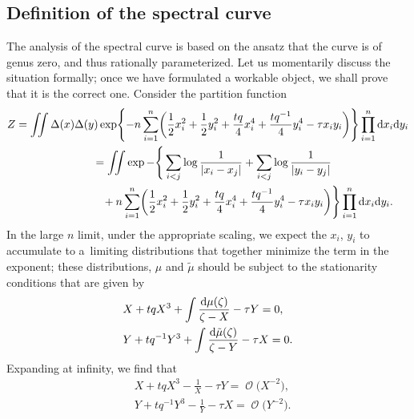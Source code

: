 \documentclass[10pt,a4paper]{amsart}
\DeclareMathOperator{\OO}{\mathcal{O}}
\numberwithin{equation}{section}
\begin{document}
\subsection{Definition of the spectral curve}
The analysis of the spectral curve is based on the ansatz that the curve is of genus zero, and thus rationally parameterized. Let us momentarily discuss the situation formally; once we have formulated a workable object, we shall prove that it is the correct one. Consider the partition function
 \begin{gather*}
 Z= \iint \Delta(x) \Delta(y) \exp\Biggl\{-n\sum_{i=1}^n \biggl(\frac{1}{2}x_i^2 + \frac{1}{2}y_i^2 + \frac{t q}{4} x_i^4 + \frac{t q^{-1}}{4} y_i^4 - \tau x_iy_i\biggr)\Biggr\} \prod_{i=1}^n {\rm d}x_i {\rm d}y_i\\
 \hphantom{Z}{}
= \iint \exp - \Bigg\{ \sum_{i < j} \log\frac{1}{|x_i - x_j|} + \sum_{i < j} \log\frac{1}{|y_i - y_j|} \\
\hphantom{Z=\iint \exp - \Bigg\{}{}
+ n\sum_{i=1}^n \biggl(\frac{1}{2}x_i^2 + \frac{1}{2}y_i^2 + \frac{t q}{4} x_i^4 + \frac{t q^{-1}}{4} y_i^4 - \tau x_iy_i\biggr)\Bigg\} \prod_{i=1}^n {\rm d}x_i {\rm d}y_i.
 \end{gather*}
In the large $n$ limit, under the appropriate scaling, we expect the $x_i$, $y_i$ to accumulate to a~limiting distributions that together minimize the term in the exponent; these distributions, $\mu$ and $\tilde \mu$ should be subject to the stationarity conditions that are given by
 \begin{align*}
 &X + t q X^3 + \int \frac{{\rm d}\mu(\zeta)}{\zeta - X} - \tau Y= 0,\\
 &Y + t q^{-1} Y^3 + \int \frac{{\rm d}\tilde{\mu}(\zeta)}{\zeta - Y} - \tau X= 0.
 \end{align*}
Expanding at infinity, we find that
 \begin{align}
 &X + t qX^3 - \frac{1}{X} - \tau Y= \OO\bigl(X^{-2}\bigr), \label{stationarity-X}\\
 &Y + t q^{-1} Y^3 - \frac{1}{Y} - \tau X= \OO\bigl(Y^{-2}\bigr).\label{stationarity-Y}
 \end{align}
\end{document}
